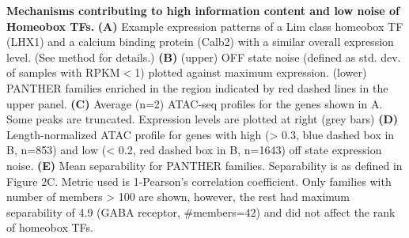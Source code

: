 \textbf{Mechanisms contributing to high information content and low noise of Homeobox TFs.}
\textbf{(A)} Example expression patterns of a Lim class homeobox TF (LHX1) and a calcium binding protein (Calb2) with a similar overall expression level. 
(See method for details.)
\textbf{(B)} (upper) OFF state noise (defined as std. dev. of samples with RPKM$<$1) plotted against maximum expression. (lower) PANTHER families enriched in the region indicated by red dashed lines in the upper panel.
\textbf{(C)} Average (n=2) ATAC-seq profiles for the genes shown in A. Some peaks are truncated. Expression levels are plotted at right (grey bars)
\textbf{(D)} Length-normalized ATAC profile for genes with high (> 0.3, blue dashed box in B, n=853) and low (< 0.2, red dashed box in B, n=1643) off state expression noise.
\textbf{(E)} Mean separability for PANTHER families. Separability is as defined in Figure 2C. Metric used is 1-Pearson's correlation coefficient. Only families with number of members > 100 are shown, however, the rest had maximum separability of 4.9 (GABA receptor, #members=42) and did not affect the rank of homeobox TFs. 

